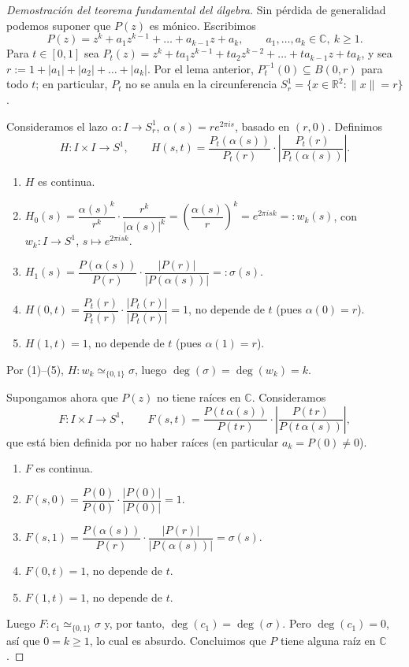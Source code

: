 \begin{proof}[Demostración del teorema fundamental del álgebra]
Sin pérdida de generalidad podemos suponer que $P(z)$ es mónico. Escribimos
\[ P(z) = z^k + a_1 z^{k-1} + \dots + a_{k-1} z + a_k, \qquad a_1,\dots,a_k \in \mathbb{C},\ k \geq 1. \]
Para $t \in [0,1]$ sea $P_t(z) = z^k + t a_1 z^{k-1} + t a_2 z^{k-2} + \dots + t a_{k-1} z + t a_k$, y sea $r := 1 + |a_1| + |a_2| + \dots + |a_k|$. Por el lema anterior, $P_t^{-1}(0) \subseteq B(0,r)$ para todo $t$; en particular, $P_t$ no se anula en la circunferencia $S^1_r = \{x \in \mathbb{R}^2 : \|x\| = r\}$.

Consideramos el lazo $\alpha \colon I \to S^1_r$, $\alpha(s) = r e^{2\pi i s}$, basado en $(r,0)$. Definimos
\[ H \colon I \times I \to S^1, \qquad H(s,t) = \frac{P_t(\alpha(s))}{P_t(r)} \cdot \left| \frac{P_t(r)}{P_t(\alpha(s))} \right|. \]
\begin{enumerate}
    \item $H$ es continua.
    \item $H_0(s) = \dfrac{\alpha(s)^k}{r^k} \cdot \dfrac{r^k}{|\alpha(s)|^k} = \left( \dfrac{\alpha(s)}{r} \right)^k = e^{2\pi i s k} =: w_k(s)$, con $w_k \colon I \to S^1$, $s \mapsto e^{2\pi i s k}$.
    \item $H_1(s) = \dfrac{P(\alpha(s))}{P(r)} \cdot \dfrac{|P(r)|}{|P(\alpha(s))|} =: \sigma(s)$.
    \item $H(0,t) = \dfrac{P_t(r)}{P_t(r)} \cdot \dfrac{|P_t(r)|}{|P_t(r)|} = 1$, no depende de $t$ (pues $\alpha(0) = r$).
    \item $H(1,t) = 1$, no depende de $t$ (pues $\alpha(1) = r$).
\end{enumerate}
Por (1)--(5), $H \colon w_k \simeq_{\{0,1\}} \sigma$, luego $\deg(\sigma) = \deg(w_k) = k$.

Supongamos ahora que $P(z)$ no tiene raíces en $\mathbb{C}$. Consideramos
\[ F \colon I \times I \to S^1, \qquad F(s,t) = \frac{P(t\,\alpha(s))}{P(t\,r)} \cdot \left| \frac{P(t\,r)}{P(t\,\alpha(s))} \right|, \]
que está bien definida por no haber raíces (en particular $a_k = P(0) \neq 0$).
\begin{enumerate}
    \item $F$ es continua.
    \item $F(s,0) = \dfrac{P(0)}{P(0)} \cdot \dfrac{|P(0)|}{|P(0)|} = 1$.
    \item $F(s,1) = \dfrac{P(\alpha(s))}{P(r)} \cdot \dfrac{|P(r)|}{|P(\alpha(s))|} = \sigma(s)$.
    \item $F(0,t) = 1$, no depende de $t$.
    \item $F(1,t) = 1$, no depende de $t$.
\end{enumerate}
Luego $F \colon c_1 \simeq_{\{0,1\}} \sigma$ y, por tanto, $\deg(c_1) = \deg(\sigma)$. Pero $\deg(c_1) = 0$, así que $0 = k \geq 1$, lo cual es absurdo. Concluimos que $P$ tiene alguna raíz en $\mathbb{C}$.
\end{proof}

